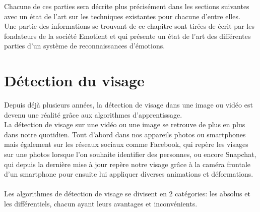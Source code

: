 \documentclass[poster]{polytech/polytech}
\begin{document}
Chacune de ces parties sera décrite plus précisément dans les sections suivantes avec un état de l'art sur les techniques existantes pour chacune d'entre elles.\\
Une partie des informations se trouvant de ce chapitre sont tirées de \cite{sota2d} écrit par les fondateurs de la société Emotient et qui présente un état de l'art des différentes parties d'un système de reconnaissances d'émotions.

\newpage
\section{Détection du visage}
Depuis déjà plusieurs années, la détection de visage dans une image ou vidéo est devenu une réalité grâce aux algorithmes d'apprentissage.\\
La détection de visage sur une vidéo ou une image se retrouve de plus en plus dans notre quotidien. Tout d'abord dans nos appareils photos ou smartphones mais également sur les réseaux sociaux comme Facebook, qui repère les visages sur une photos lorsque l'on souhaite identifier des personnes, ou encore Snapchat, qui depuis la dernière mise à jour repère notre visage grâce à la caméra frontale d'un smartphone pour ensuite lui appliquer diverses animations et déformations.\\
\\
Les algorithmes de détection de visage se divisent en 2 catégories: les absolus et les différentiels, chacun ayant leurs avantages et inconvénients.\\
\end{document}
